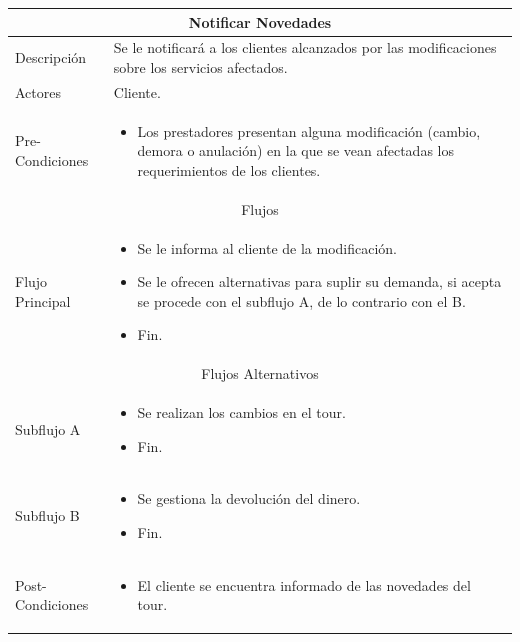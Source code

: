 \documentclass[12pt,a4paper]{article}
\newenvironment{myitemize}
{\begin{itemize}[leftmargin=*,noitemsep,topsep=0pt]}{\end{itemize}}
\newenvironment{caseuse}
{\begin{center}\begin{tabular}{|l|p{10cm}|}}{\end{tabular}\end{center}}
\begin{document}
			\begin{caseuse}
				\hline
				\multicolumn{2}{|c|}{Notificar Novedades} \\ \hline

				Descripción & Se le notificará a los clientes alcanzados por las modificaciones sobre los servicios afectados. \\ \hline

				Actores & Cliente. \\ \hline

				Pre-Condiciones & 
					\begin{myitemize}
						\item Los prestadores presentan alguna modificación (cambio, demora o anulación) en la que se vean afectadas los requerimientos de los clientes.
					\end{myitemize} \\ \hline

				\multicolumn{2}{|c|}{Flujos} \\ \hline

				Flujo Principal &
					\begin{myitemize}
						\item Se le informa al cliente de la modificación.
						\item Se le ofrecen alternativas para suplir su demanda, si acepta se procede con el subflujo A, de lo contrario con el B.
						\item Fin.
					\end{myitemize} \\ \hline

				\multicolumn{2}{|c|}{Flujos Alternativos} \\ \hline

				Subflujo A & 
					\begin{myitemize}
						\item Se realizan los cambios en el tour.
						\item Fin.
					\end{myitemize} \\ \hline

				Subflujo B & 
					\begin{myitemize}
						\item Se gestiona la devolución del dinero.
						\item Fin.
					\end{myitemize} \\ \hline

				Post-Condiciones &
					\begin{myitemize}
						\item El cliente se encuentra informado de las novedades del tour.
					\end{myitemize}\\ \hline
			\end{caseuse}
\end{document}
